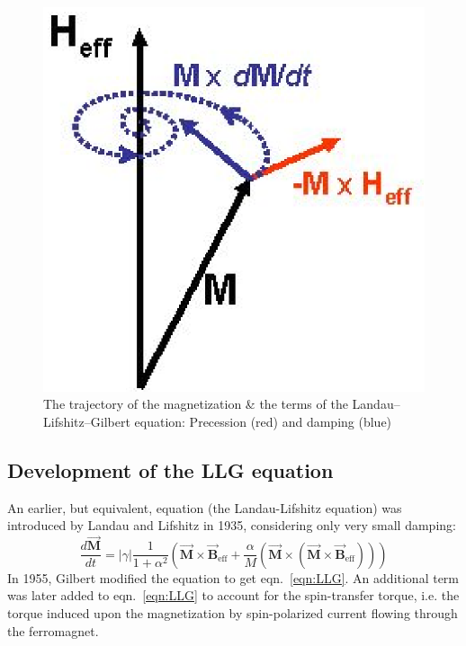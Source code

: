 {{		\begin{figure}[H]
			\begin{center}
				\includegraphics[scale=1]{me20b178/me20b178_2.eps}
			\end{center}
			\caption{The trajectory of the magnetization \& the terms of the Landau–Lifshitz–Gilbert equation: Precession (red) and damping (blue)}
			\label{fig:damped_magnetic_precession} 
		\end{figure}
	}

	\subsection{Development of the LLG equation}
	{
		\vspace{0.25cm}
		An earlier, but equivalent, equation (the Landau-Lifshitz equation) was introduced by Landau and Lifshitz in 1935, considering only very small damping:
		\begin{equation}
			\frac{d\overrightarrow{\mathbf{M}}}{dt}=|\gamma| \frac{1}{1+\alpha^{2}}\left(\overrightarrow{\mathbf{M}} \times \overrightarrow{\mathbf{B}}_{\mathrm{eff}}+\frac{\alpha}{M}\left(\overrightarrow{\mathbf{M}} \times\left(\overrightarrow{\mathbf{M}} \times \overrightarrow{\mathbf{B}}_{\mathrm{eff}}\right)\right)\right)
			\label{eqn:LL}
		\end{equation}
		In 1955, Gilbert modified the equation to get eqn.~\ref{eqn:LLG}.
		\newline
		\newline
		An additional term was later added to eqn.~\ref{eqn:LLG} to account for the spin-transfer torque, i.e. the torque induced upon the magnetization by spin-polarized current flowing through the ferromagnet.
	}
}
